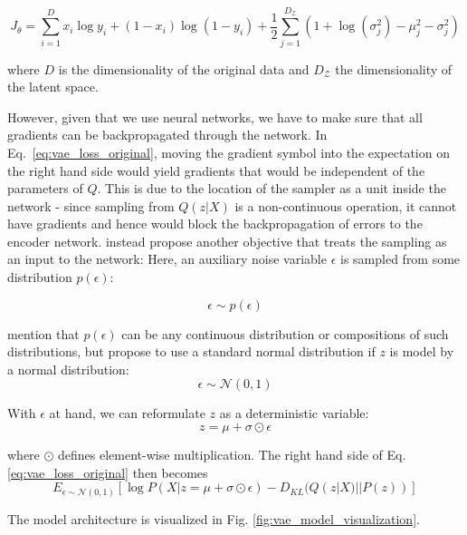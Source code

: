 \documentclass[6pt]{article}
\begin{document}
\begin{equation}
J_\theta = \sum_{i=1}^{D} x_i \log y_i + (1-x_i) \log (1-y_i) + \frac{1}{2}\sum_{j=1}^{D_{\mathcal{Z}}}(1+\log(\sigma_j^2)-\mu_j^2-\sigma_j^2)
\end{equation}

\noindent where $D$ is the dimensionality of the original data and $D_{\mathcal{Z}}$ the dimensionality of the latent space.

However, given that we use neural networks, we have to make sure that all gradients can be backpropagated through the network. In Eq.~\ref{eq:vae_loss_original}, moving the gradient symbol into the expectation on the right hand side would yield gradients that would be independent of the parameters of $Q$. This is due to the location of the sampler as a unit inside the network - since sampling from $Q(z|X)$ is a non-continuous operation, it cannot have gradients and hence would block the backpropagation of errors to the encoder network. \cite{kingma2013auto} instead propose another objective that treats the sampling as an input to the network: Here, an auxiliary noise variable $\epsilon$ is sampled from some distribution $p(\epsilon)$:

\begin{equation}
\epsilon \sim p(\epsilon)
\end{equation}

\cite{kingma2013auto} mention that  $p(\epsilon)$ can be any continuous distribution or compositions of such distributions, but propose to use a standard normal distribution if $z$ is model by a normal distribution:
\begin{equation}
\epsilon \sim \mathcal{N}(0,1)
\end{equation}

With $\epsilon$ at hand, we can reformulate $z$ as a deterministic variable:
\begin{equation}
z = \mu + \sigma \odot \epsilon
\end{equation}

where $\odot$ defines element-wise multiplication.
The right hand side of Eq. \ref{eq:vae_loss_original} then becomes
\begin{equation}
\label{eq:vae_loss_reparameterized}
E_{\epsilon \sim \mathcal{N}(0,1)}[\log P(X|z= \mu + \sigma \odot \epsilon) - D_{KL}(Q(z|X)||P(z))] 
\end{equation}

The model architecture is visualized in Fig. \ref{fig:vae_model_visualization}. 
\end{document}

